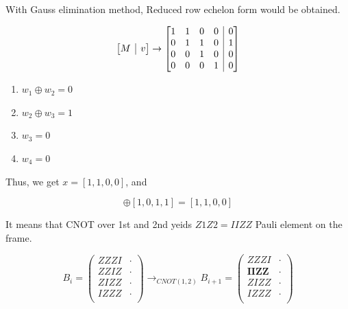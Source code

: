 \documentclass[a4paper,12pt]{article}
\newcommand{\rvline}{\hspace*{-\arraycolsep}\vline\hspace*{-\arraycolsep}}
\begin{document}
With Gauss elimination method, Reduced row echelon form would be obtained.

\begin{eqnarray}
    \begin{bmatrix}
        M &\rvline& v\\
    \end{bmatrix} \rightarrow 
    \begin{bmatrix}
        1 & 1 & 0 & 0 & \rvline & 0\\
        0 & 1 & 1 & 0 & \rvline & 1\\
        0 & 0 & 1 & 0 & \rvline & 0\\
        0 & 0 & 0 & 1 & \rvline & 0\\
    \end{bmatrix}
\end{eqnarray}


\begin{enumerate}
    \item $w_1 \oplus w_2 = 0$
    \item $w_2 \oplus w_3 = 1$
    \item $w_3 = 0$
    \item $w_4 = 0$
\end{enumerate}

Thus, we get $x = [1, 1, 0, 0]$, and


\begin{equation}
    [0, 1, 1, 1] \oplus [1, 0, 1, 1] = [1, 1, 0, 0]
\end{equation}

It means that CNOT over 1st and 2nd yeids $Z1Z2 = IIZZ$ Pauli element on the frame.

\begin{equation}
    B_i = \begin{pmatrix}
        ZZZI & \cdot \\
        ZZIZ & \cdot \\
        ZIZZ & \cdot \\
        IZZZ & \cdot \\
    \end{pmatrix}
    \rightarrow_{CNOT (1, 2)}
    B_{i+1} = \begin{pmatrix}
        ZZZI & \cdot \\
        \mathbf{IIZZ} & \cdot \\
        ZIZZ & \cdot \\
        IZZZ & \cdot \\
    \end{pmatrix}
\end{equation}
\end{document}
